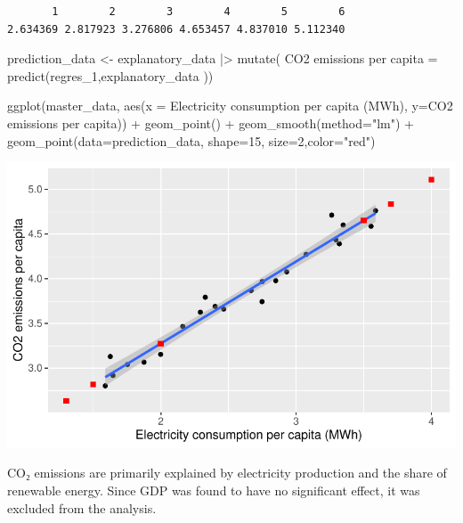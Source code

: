 \documentclass[
  letterpaper,
  DIV=11,
  numbers=noendperiod]{scrartcl}
\newenvironment{Shaded}{\begin{snugshade}}{\end{snugshade}}
\newcommand{\AttributeTok}[1]{\textcolor[rgb]{0.40,0.45,0.13}{#1}}
\newcommand{\DecValTok}[1]{\textcolor[rgb]{0.68,0.00,0.00}{#1}}
\newcommand{\FunctionTok}[1]{\textcolor[rgb]{0.28,0.35,0.67}{#1}}
\newcommand{\NormalTok}[1]{\textcolor[rgb]{0.00,0.23,0.31}{#1}}
\newcommand{\OtherTok}[1]{\textcolor[rgb]{0.00,0.23,0.31}{#1}}
\newcommand{\SpecialCharTok}[1]{\textcolor[rgb]{0.37,0.37,0.37}{#1}}
\newcommand{\StringTok}[1]{\textcolor[rgb]{0.13,0.47,0.30}{#1}}
\begin{document}
\begin{verbatim}
       1        2        3        4        5        6 
2.634369 2.817923 3.276806 4.653457 4.837010 5.112340 
\end{verbatim}

\begin{Shaded}
\begin{Highlighting}[]
\NormalTok{prediction\_data }\OtherTok{\textless{}{-}}\NormalTok{ explanatory\_data }\SpecialCharTok{|\textgreater{}} \FunctionTok{mutate}\NormalTok{(}
  \StringTok{\textasciigrave{}}\AttributeTok{CO2 emissions per capita}\StringTok{\textasciigrave{}} \OtherTok{=} \FunctionTok{predict}\NormalTok{(regres\_1,explanatory\_data ))}

\FunctionTok{ggplot}\NormalTok{(master\_data, }\FunctionTok{aes}\NormalTok{(}\AttributeTok{x =} \StringTok{\textasciigrave{}}\AttributeTok{Electricity consumption per capita (MWh)}\StringTok{\textasciigrave{}}\NormalTok{, }\AttributeTok{y=}\StringTok{\textasciigrave{}}\AttributeTok{CO2 emissions per capita}\StringTok{\textasciigrave{}}\NormalTok{)) }\SpecialCharTok{+}
  \FunctionTok{geom\_point}\NormalTok{() }\SpecialCharTok{+}
  \FunctionTok{geom\_smooth}\NormalTok{(}\AttributeTok{method=}\StringTok{"lm"}\NormalTok{) }\SpecialCharTok{+} \FunctionTok{geom\_point}\NormalTok{(}\AttributeTok{data=}\NormalTok{prediction\_data, }\AttributeTok{shape=}\DecValTok{15}\NormalTok{, }\AttributeTok{size=}\DecValTok{2}\NormalTok{,}\AttributeTok{color=}\StringTok{"red"}\NormalTok{)}
\end{Highlighting}
\end{Shaded}

\includegraphics{project_files/figure-pdf/unnamed-chunk-24-1.pdf}

CO₂ emissions are primarily explained by electricity production and the
share of renewable energy. Since GDP was found to have no significant
effect, it was excluded from the analysis.
\end{document}
